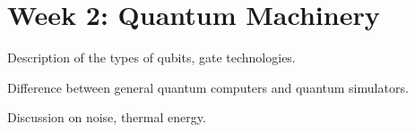 \section{Week 2: Quantum Machinery}

Description of the types of qubits, gate technologies.

Difference between general quantum computers and quantum simulators.

Discussion on noise, thermal energy.
